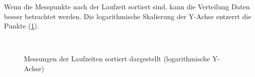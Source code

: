 \documentclass[
	12pt,
	a4paper,
	BCOR10mm,
	DIV14,
	listof=totoc,
	bibliography=totoc,
	headsepline
]{scrreprt}
\begin{document}
Wenn die Messpunkte nach der Laufzeit sortiert sind, kann die Verteilung Daten besser betrachtet werden. Die logarithmische Skalierung der Y-Achse entzerrt die Punkte (\ref{Laufzeiten_Sortiert}).

\begin{figure}
	\hfill
	\\
	\hfill
	\caption{Messungen der Laufzeiten sortiert dargestellt (logarithmische Y-Achse)}
	\label{Laufzeiten_Sortiert}
\end{figure} 
\end{document}
